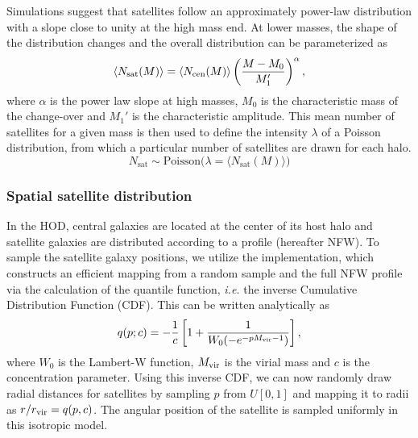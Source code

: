 \documentclass[a4paper,usenatbib]{mnras}
\newcommand{\CH}[1]{{\color{green}CH: #1}}
\newcommand{\CM}[1]{{\color{cyan}CM: #1}}
\begin{document}
Simulations suggest that satellites follow an approximately power-law distribution with a slope close to unity at the high mass end. At lower masses, the shape of the distribution changes and the overall distribution can be parameterized as
\begin{equation}
    \langle N_\textrm{sat}(M) \rangle = \langle N_{\rm cen}(M) \rangle \left( \frac{M-M_0}{M_1'} \right)^\alpha,
    \label{eq:nsat}
\end{equation}
where $\alpha$ is the power law slope at high masses, $M_0$ is the characteristic mass of the change-over and $M_1'$ is the characteristic amplitude.  This mean number of satellites for a given mass is then used to define the intensity $\lambda$ of a Poisson distribution, from which a particular number of satellites are drawn for each halo.
\begin{equation}
    N_\textrm{sat} \sim \textrm{Poisson}\big(\lambda = \langle N_\textrm{sat}(M) \rangle \big)
    \label{eq:nsatsample}
\end{equation}


\subsubsection{Spatial satellite distribution}

In the \cite{2007zheng} HOD, central galaxies are located at the center 
of its host halo and satellite galaxies are distributed according to a 
\cite{nfw1997} profile (hereafter NFW).
To sample the satellite galaxy positions, we utilize the \cite{2018RNAAS...2...55R} 
implementation, which constructs an efficient mapping from a random sample 
and the full NFW profile via the calculation of the quantile function, 
\emph{i.e.} the inverse Cumulative Distribution Function (CDF). 
This can be written analytically as
\begin{equation}
    q(p;c) = -\frac{1}{c}\left[ 1 + \frac{1}{W_0(-e^{-pM_{\rm vir}-1})} \right],
    \label{eq:NFW}
\end{equation}
where $W_0$ is the Lambert-W function, $M_{\rm vir}$ is the virial mass and $c$ is the concentration parameter. Using this inverse CDF, we can now randomly draw radial distances for satellites by sampling  $p$ from $U[0,1]$ and mapping it to radii as $r/r_{\rm vir} = q(p,c)$. The angular position of the satellite is sampled uniformly in this isotropic model.%
\end{document}
